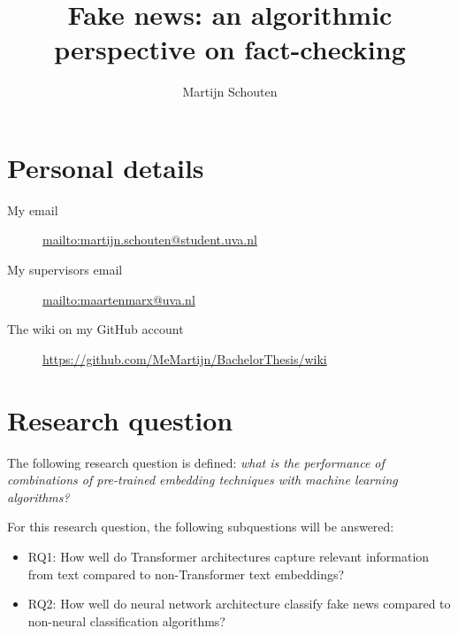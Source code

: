 \documentclass[a4paper,pdf]{article} %
\begin{document}
\title{Fake news: an algorithmic perspective on fact-checking} %
\author{Martijn Schouten}

\maketitle




\section{Personal details}

\begin{description}
 \item[My email] \url{mailto:martijn.schouten@student.uva.nl }
 \item[My supervisors email] \url{mailto:maartenmarx@uva.nl }
 \item[The wiki on my GitHub account] \url{https://github.com/MeMartijn/BachelorThesis/wiki}
 \end{description} 

\section{Research question}

The following research question is defined: \textit{what is the performance of combinations of pre-trained embedding techniques with machine learning algorithms?}

For this research question, the following subquestions will be answered:
\begin{itemize}
  \item RQ1: How well do Transformer architectures capture relevant information from text compared to non-Transformer text embeddings?
  \item RQ2: How well do neural network architecture classify fake news compared to non-neural classification algorithms?
\end{itemize}
\end{document}
